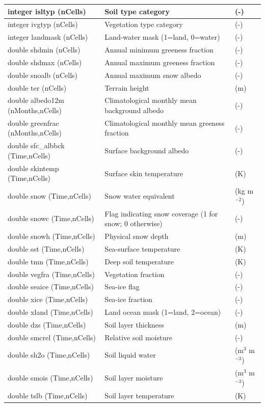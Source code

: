 \documentclass[11pt]{report}
\begin{document}
{\small
\begin{longtable}{|p{2.0in} |p{3.0in} |p{1.0in} |}
\hline
integer isltyp (nCells) & Soil type category & (-) \\ \hline
integer ivgtyp (nCells) & Vegetation type category & (-) \\ \hline
integer landmask (nCells) & Land-water mask (1=land, 0=water) & (-) \\ \hline
double shdmin  (nCells) & Annual minimum greeness fraction & (-) \\ \hline
double shdmax (nCells) & Annual maximum greeness fraction & (-) \\ \hline
double snoalb (nCells) & Annual maximum snow albedo & (-) \\ \hline
double ter (nCells) & Terrain height & (m) \\ \hline
double albedo12m \hfill\break (nMonths,nCells) & Climatological monthly mean background albedo& (-) \\ \hline
double greenfrac \hfill\break (nMonths,nCells) & Climatological monthly mean greeness fraction & (-) \\ \hline
double sfc\_albbck (Time,nCells) & Surface background albedo& (-) \\ \hline
double skintemp (Time,nCells) & Surface skin temperature & (K) \\ \hline
double snow (Time,nCells) & Snow water equivalent & (kg m$^{-2}$) \\ \hline
double snowc (Time,nCells) & Flag indicating snow coverage (1 for snow; 0 otherwise) & (-) \\ \hline
double snowh (Time,nCells) & Physical snow depth & (m) \\ \hline
double sst (Time,nCells) & Sea-surface temperature & (K) \\ \hline
double tmn (Time,nCells) & Deep soil temperature & (K) \\ \hline
double vegfra (Time,nCells) & Vegetation fraction & (-) \\ \hline
double seaice (Time,nCells) & Sea-ice flag & (-) \\ \hline
double xice (Time,nCells) & Sea-ice fraction & (-) \\ \hline
double xland (Time,nCells) & Land ocean mask (1=land, 2=ocean) & (-) \\ \hline
double dzs (Time,nCells) & Soil layer thickness & (m) \\ \hline
double smcrel (Time,nCells) & Relative soil moisture & (-) \\ \hline
double sh2o (Time,nCells) & Soil liquid water & (m$^{3}$ m$^{-3}$) \\ \hline
double smois (Time,nCells) & Soil layer moisture & (m$^{3}$ m$^{-3}$) \\ \hline
double tslb (Time,nCells) & Soil layer temperature & (K) \\ \hline
\end{longtable}
}
\end{document}
